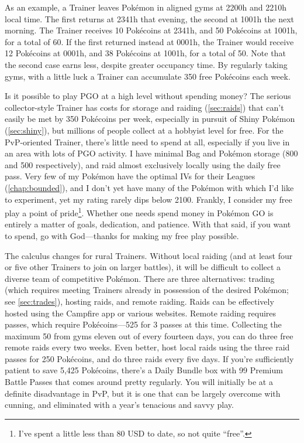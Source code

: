 As an example, a Trainer leaves Pokémon in aligned gyms at 2200h and 2210h local time.
The first returns at 2341h that evening, the second at 1001h the next morning.
The Trainer receives 10 Pokécoins at 2341h, and 50 Pokécoins at 1001h, for a total of 60.
If the first returned instead at 0001h, the Trainer would receive 12 Pokécoins at 0001h,
  and 38 Pokécoins at 1001h, for a total of 50.
Note that the second case earns less, despite greater occupancy time.
By regularly taking gyms, with a little luck a Trainer can accumulate 350 free Pokécoins each week.

Is it possible to play PGO at a high level without spending money?
The serious collector-style Trainer has costs for storage and raiding (\autoref{sec:raids})
  that can't easily be met by 350 Pokécoins per week, especially
  in pursuit of Shiny Pokémon (\autoref{sec:shiny}),
  but millions of people collect at a hobbyist level for free.
For the PvP-oriented Trainer, there's little need to spend at all,
  especially if you live in an area with lots of PGO activity.
I have minimal Bag and Pokémon storage (800 and 500 respectively), and raid almost exclusively locally using the daily free pass.
Very few of my Pokémon have the optimal IVs for their Leagues (\autoref{chap:bounded}),
  and I don't yet have many of the Pokémon with which I'd like to experiment,
  yet my rating rarely dips below 2100.
Frankly, I consider my free play a point of pride\footnote{I've spent a little less than 80 USD to date, so not quite ``free''.}.
Whether one needs spend money in Pokémon GO is entirely a matter of goals, dedication, and patience.
With that said, if you want to spend, go with God---thanks for making my free play possible.

The calculus changes for rural Trainers.
Without local raiding (and at least four or five other Trainers to join on larger battles),
  it will be difficult to collect a diverse team of competitive Pokémon.
There are three alternatives: trading (which requires meeting Trainers already in possession of the desired Pokémon;
  see \autoref{sec:trades}), hosting raids, and remote raiding.
Raids can be effectively hosted using the Campfire app or various websites.
Remote raiding requires passes, which require Pokécoins---525 for 3 passes at this time.
Collecting the maximum 50 from gyms eleven out of every fourteen days, you can do
  three free remote raids every two weeks.
Even better, host local raids using the three raid passes for 250 Pokécoins, and
 do three raids every five days.
If you're sufficiently patient to save 5,425 Pokécoins, there's a Daily Bundle box
 with 99 Premium Battle Passes that comes around pretty regularly.
You will initially be at a definite disadvantage in PvP, but it is one that can
  be largely overcome with cunning, and eliminated with a year's tenacious
  and savvy play.

